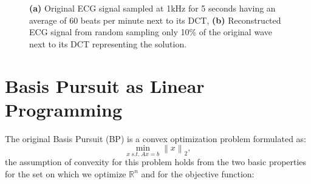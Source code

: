 \documentclass[journal,article,submit,electronics,pdftex]{Definitions/mdpi}
\newcommand{\norm}[1]{\left\lVert#1\right\rVert}
\begin{document}
{\begin{figure}[H]
\centering
{}
\caption{\textbf{(a)} Original ECG signal sampled at 1kHz for 5 seconds having an average of 60 beats per minute next to its DCT, \textbf{(b)} Reconstructed ECG signal from random sampling only 10\% of the original wave next to its DCT representing the solution.}
\label{fig:reconstruction}
\end{figure}


\section{Basis Pursuit as Linear Programming}

The original Basis Pursuit (BP) is a convex optimization problem formulated as:
\begin{equation}
\label{eqn:BP}
\min\limits_{x\:s.t.\:Ax = b}\norm{x}_2,
\end{equation}
the assumption of convexity for this problem holds from the two basic properties for the set on which we optimize $\mathbb{R}^n$ and for the objective function:

}
\end{document}
